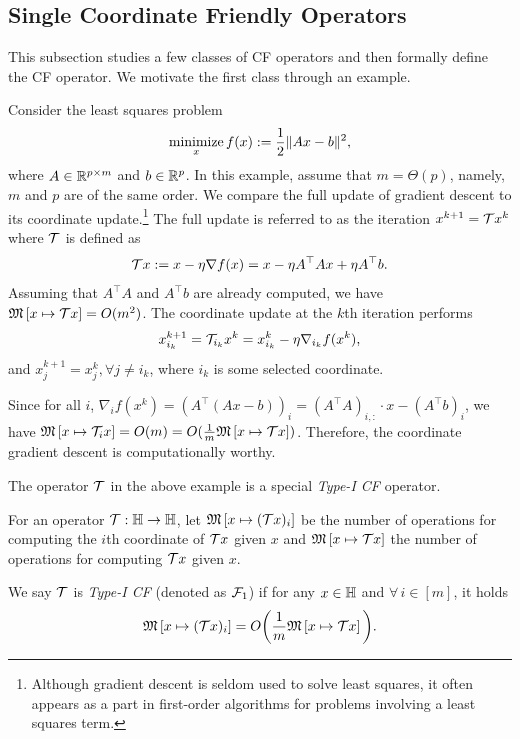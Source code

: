 \subsection{Single Coordinate Friendly Operators}
This subsection studies a few classes of CF operators and then formally define the CF operator. We motivate the first class through an example.
\begin{example}\label{ex:lsq1}
Consider the least squares problem
\begin{equation}
\Min_{x} f(x):=\frac{1}{2} \|A x - b\|^2,\label{lsq}
\end{equation}
where $A \in \mathbb{R}^{p \times m}$ and $b \in \mathbb{R}^p$. In this example, assume that $m=\Theta(p)$, namely, $m$ and $p$ are of the same order.  We compare the full update of gradient descent to its coordinate update.\footnote{Although gradient descent is seldom used to solve least squares, it often appears as a part in first-order algorithms for problems involving a least squares term.} 
The full update is referred to as the iteration
$x^{k+1}= {\mathcal{T}} x^k $ where ${\mathcal{T}}$ is defined as
\begin{equation}
\cT x:=x-\eta\nabla f(x)=x-\eta A^\top Ax + \eta A^\top b.
\end{equation}
Assuming that $ A^\top A$ and $ A^\top b$ are already computed, we have $\mathfrak{M}\left[{x}\mapsto {{\mathcal{T}}x}\right]=O(m^2)$. The coordinate update at the $k$th iteration performs
$$x_{i_k}^{k+1}={\mathcal{T}}_{i_k} x^k =x^k_{i_k}-\eta\nabla_{i_k} f(x^k),$$
and $x_j^{k+1}=x_j^{k},\forall j\neq i_k$, where $i_k$ is some selected coordinate. 

Since for all $i$, $\nabla_i f(x^k)=\left(A^\top (Ax-b)\right)_{i}=(A^\top A)_{i,:}\cdot x-(A^\top b)_{i}$,
we have $\mathfrak{M}\left[{x}\mapsto {{\mathcal{T}}_i x }\right]=O(m)=O(\frac{1}{m}\mathfrak{M}\left[{x}\mapsto {{\mathcal{T}}x}\right])$. Therefore, the coordinate gradient descent is computationally worthy. 
\end{example}
The operator ${\mathcal{T}}$ in the above example is a special \emph{Type-I CF} operator.
\begin{definition}[Type-I CF]
For an operator ${\mathcal{T}}: \mathbb{H}\to\mathbb{H}$, let $\mathfrak{M}\left[{x}\mapsto {({\mathcal{T}}x)_i}\right]$ be the number of operations for computing the $i$th coordinate of ${\mathcal{T}} x$ given $x$ and $\mathfrak{M}\left[{x}\mapsto {{\mathcal{T}}x}\right]$ the number of operations for computing ${\mathcal{T}} x$ given $x$. 

We say ${\mathcal{T}}$ is \emph{Type-I CF} (denoted as ${\mathcal{F}}_1$) if for any $x\in\mathbb{H}$ and $\forall\, i\in [m]$, it holds
$$\mathfrak{M}\left[{x}\mapsto {({\mathcal{T}}x)_i}\right]= O\bigg(\frac{1}{m}\mathfrak{M}\left[{x}\mapsto {{\mathcal{T}}x}\right]\bigg).$$
\end{definition}
